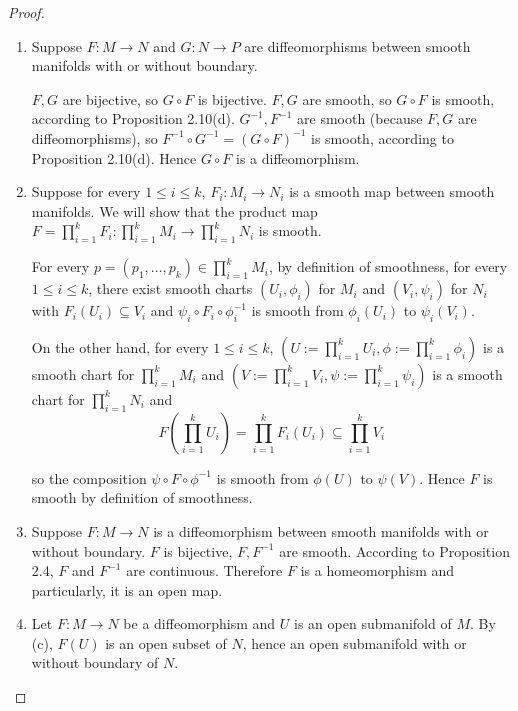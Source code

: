 \begin{proof}
    \begin{enumerate}[itemsep=0pt,label={(\alph*)}]
        \item Suppose \( F: M \to N \) and \( G: N \to P \) are diffeomorphisms between smooth manifolds with or without boundary.

              \( F, G \) are bijective, so \( G \circ F \) is bijective. \( F, G \) are smooth, so \( G \circ F \) is smooth, according to Proposition 2.10(d). \( G^{-1}, F^{-1} \) are smooth (because \(F, G\) are diffeomorphisms), so \( F^{-1} \circ G^{-1} = {(G \circ F)}^{-1} \) is smooth, according to Proposition 2.10(d). Hence \( G \circ F \) is a diffeomorphism.
        \item Suppose for every \( 1 \le i \le k \), \( F_{i}: M_{i} \to N_{i} \) is a smooth map between smooth manifolds. We will show that the product map \( F = \prod_{i=1}^{k} F_{i}: \prod_{i=1}^{k} M_{i} \to \prod_{i=1}^{k} N_{i} \) is smooth.

              For every \( p = (p_{1}, \ldots, p_{k}) \in \prod_{i=1}^{k} M_{i} \), by definition of smoothness, for every \( 1 \le i \le k \), there exist smooth charts \( (U_{i}, \phi_{i}) \) for \( M_{i} \) and \( (V_{i}, \psi_{i}) \) for \( N_{i} \) with \( F_{i}(U_{i}) \subseteq V_{i} \) and \( \psi_{i} \circ F_{i} \circ \phi_{i}^{-1} \) is smooth from \( \phi_{i}(U_{i}) \) to \( \psi_{i}(V_{i}) \).

              On the other hand, for every \( 1 \le i \le k \), \( \left( U := \prod_{i=1}^{k} U_{i}, \phi := \prod_{i=1}^{k} \phi_{i} \right) \) is a smooth chart for \( \prod_{i=1}^{k} M_{i} \) and \( \left( V := \prod_{i=1}^{k} V_{i}, \psi := \prod_{i=1}^{k} \psi_{i} \right) \) is a smooth chart for \( \prod_{i=1}^{k} N_{i} \) and
              \[
                  F\left( \prod_{i=1}^{k} U_{i} \right) = \prod_{i=1}^{k} F_{i}(U_{i}) \subseteq \prod_{i=1}^{k} V_{i}
              \]

              so the composition \( \psi \circ F \circ \phi^{-1} \) is smooth from \( \phi(U) \) to \( \psi(V) \). Hence \( F \) is smooth by definition of smoothness.
        \item Suppose \( F: M \to N \) is a diffeomorphism between smooth manifolds with or without boundary. \( F \) is bijective, \( F, F^{-1} \) are smooth. According to Proposition 2.4, \( F \) and \( F^{-1} \) are continuous. Therefore \( F \) is a homeomorphism and particularly, it is an open map.
        \item Let \( F: M \to N \) be a diffeomorphism and \( U \) is an open submanifold of \( M \). By (c), \( F(U) \) is an open subset of \( N \), hence an open submanifold with or without boundary of \( N \).


\end{enumerate}
\end{proof}
